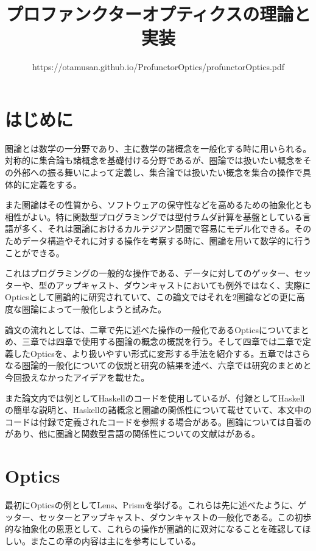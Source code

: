 \documentclass[uplatex,dvipdfmx]{jsarticle}
\begin{document}
  \title{プロファンクターオプティクスの理論と実装}
  \author{https://otamusan.github.io/ProfunctorOptics/profunctorOptics.pdf}
  \maketitle

	\tableofcontents
  \pagebreak
  \section{はじめに}
  圏論とは数学の一分野であり、主に数学の諸概念を一般化する時に用いられる。対称的に集合論も諸概念を基礎付ける分野であるが、圏論では扱いたい概念をその外部への振る舞いによって定義し、集合論では扱いたい概念を集合の操作で具体的に定義をする。

  また圏論はその性質から、ソフトウェアの保守性などを高めるための抽象化とも相性がよい。特に関数型プログラミングでは型付ラムダ計算を基盤としている言語が多く、それは圏論におけるカルテジアン閉圏で容易にモデル化できる。そのためデータ構造やそれに対する操作を考察する時に、圏論を用いて数学的に行うことができる。

  これはプログラミングの一般的な操作である、データに対してのゲッター、セッターや、型のアップキャスト、ダウンキャストにおいても例外ではなく、実際にOpticsとして圏論的に研究されていて、この論文ではそれを2圏論などの更に高度な圏論によって一般化しようと試みた。

  論文の流れとしては、二章で先に述べた操作の一般化であるOpticsについてまとめ、三章では四章で使用する圏論の概念の概説を行う。そして四章では二章で定義したOpticsを、より扱いやすい形式に変形する手法を紹介する。五章ではさらなる圏論的一般化についての仮説と研究の結果を述べ、六章では研究のまとめと今回扱えなかったアイデアを載せた。

  また論文内では例としてHaskellのコードを使用しているが、付録としてHaskellの簡単な説明と、Haskellの諸概念と圏論の関係性について載せていて、本文中のコードは付録で定義されたコードを参照する場合がある。圏論については自著の\cite{cti}があり、他に圏論と関数型言語の関係性についての文献は\cite{dao_of_fp}がある。
  \section{Optics}
  最初にOpticsの例としてLens、Prismを挙げる。これらは先に述べたように、ゲッター、セッターとアップキャスト、ダウンキャストの一般化である。この初歩的な抽象化の恩恵として、これらの操作が圏論的に双対になることを確認してほしい。またこの章の内容は主に\cite{categories_of_optics}を参考にしている。
\end{document}
